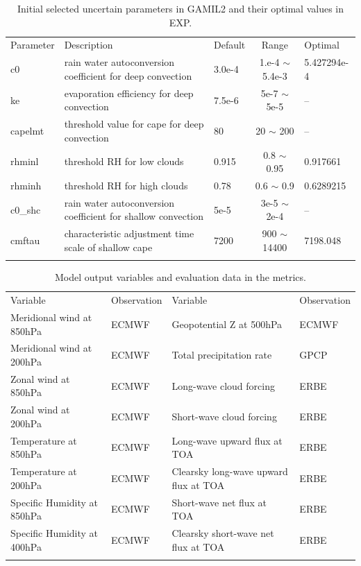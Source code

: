 \documentclass[gmd, manuscript]{copernicus}
\begin{document}
\begin{table}[t]
\caption{Initial selected uncertain parameters in GAMIL2 and their optimal values in EXP.}
\begin{tabular}{l l l c l}
\tophline
Parameter & Description & Default & Range & Optimal \\
\middlehline
c0 & rain water autoconversion coefficient for deep convection & 3.0e-4 & 1.e-4 $\sim$ 5.4e-3 & 5.427294e-4\\
ke & evaporation efficiency for deep convection & 7.5e-6 & 5e-7 $\sim$ 5e-5 & --\\
capelmt & threshold value for cape for deep convection & 80 & 20 $\sim$ 200 & --\\
rhminl & threshold RH for low clouds & 0.915 & 0.8 $\sim$ 0.95 & 0.917661 \\
rhminh & threshold RH for high clouds & 0.78 & 0.6 $\sim$ 0.9 & 0.6289215\\
c0\_shc & rain water autoconversion coefficient for shallow convection & 5e-5 & 3e-5 $\sim$ 2e-4 & -- \\
cmftau & characteristic adjustment time scale of shallow cape & 7200 & 900 $\sim$ 14400 & 7198.048 \\
\bottomhline
\end{tabular}
\belowtable{} %
\end{table}

\begin{table}[t]
\caption{Model output variables and evaluation data in the metrics.}
\begin{tabular}{l l l l}
\tophline
Variable & Observation & Variable & Observation \\
\middlehline
Meridional wind at 850hPa   & ECMWF & Geopotential Z at 500hPa              & ECMWF \\
Meridional wind at 200hPa   & ECMWF & Total precipitation rate              & GPCP \\
Zonal wind at 850hPa        & ECMWF & Long-wave cloud forcing                & ERBE \\
Zonal wind at 200hPa        & ECMWF & Short-wave cloud forcing               & ERBE \\
Temperature at 850hPa       & ECMWF & Long-wave upward flux at TOA          & ERBE \\
Temperature at 200hPa       & ECMWF & Clearsky long-wave upward flux at TOA & ERBE \\
Specific Humidity at 850hPa & ECMWF & Short-wave net flux at TOA            & ERBE \\
Specific Humidity at 400hPa & ECMWF & Clearsky short-wave net flux at TOA   & ERBE \\
\bottomhline
\end{tabular}
\belowtable{} %
\end{table}
\end{document}
